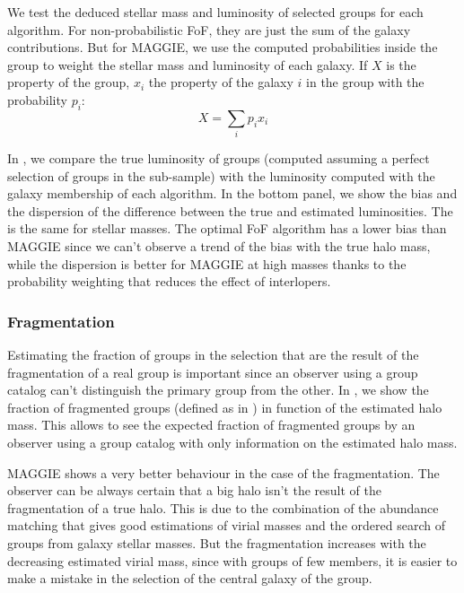 We test the deduced stellar mass and luminosity of selected groups for each
algorithm. For non-probabilistic FoF, they are just the sum of the galaxy
contributions. But for MAGGIE, we use the computed probabilities inside the
group to weight the stellar mass and luminosity of each galaxy. If $X$ is the
property of the group, $x_i$ the property of the galaxy $i$ in the group with
the probability $p_i$:
%
\begin{equation}
    X = \sum_i p_i x_i
\end{equation}

In , we compare the true luminosity of groups
(computed assuming a perfect selection of groups in the sub-sample) with the
luminosity computed with the galaxy membership of each algorithm. In the bottom
panel, we show the bias and the dispersion of the difference between the true
and estimated luminosities. The  is the
same for stellar masses. The optimal FoF algorithm has a lower bias than MAGGIE
since we can't observe a trend of the bias with the true halo mass, while the
dispersion is better for MAGGIE at high masses thanks to the probability
weighting that reduces the effect of interlopers.

\subsubsection{Fragmentation}

Estimating the fraction of groups in the selection that are the result of the
fragmentation of a real group is important since an observer using a group
catalog can't distinguish the primary group from the other. In
, we show the fraction of fragmented groups (defined
as in ) in function of the
estimated halo mass. This allows to see the expected fraction of fragmented
groups by an observer using a group catalog with only information on the
estimated halo mass.

MAGGIE shows a very better behaviour in the case of the fragmentation. The
observer can be always certain that a big halo isn't the result of the
fragmentation of a true halo. This is due to the combination of the abundance
matching that gives good estimations of virial masses and the ordered search
of groups from galaxy stellar masses. But the fragmentation increases with the
decreasing estimated virial mass, since with groups of few members, it is
easier to make a mistake in the selection of the central galaxy of the group.

